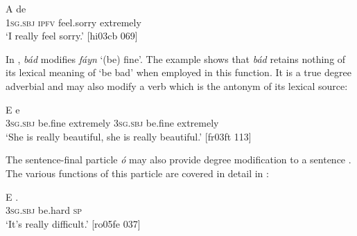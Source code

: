 \ea%
    \label{ex:key:897}
    \gll A    de        \\
\textsc{1sg.sbj}  \textsc{ipfv}  feel.sorry  extremely\\

\glt ‘I really feel sorry.’ [hi03cb 069]
\z

In , \textit{bád} modifies \textit{fáyn} ‘(be) fine’. The example shows that \textit{bád} retains nothing of its lexical meaning of ‘be bad’ when employed in this function. It is a true degree adverbial and may also modify a verb which is the antonym of its lexical source:


\ea%
    \label{ex:key:898}
    \gll E            e      \\
\textsc{3sg.sbj}  be.fine  extremely  \textsc{3sg.sbj}  be.fine  extremely\\

\glt ‘She is really beautiful, she is really beautiful.’ [fr03ft 113]
\z

The sentence-final particle \textit{ó} may also provide degree modification to a sentence . The various functions of this particle are covered in detail in :


\ea%
    \label{ex:key:899}
    \gll E        .\\
\textsc{3sg.sbj}  be.hard  \textsc{sp}\\

\glt ‘It’s really difficult.’ [ro05fe 037]
\z

